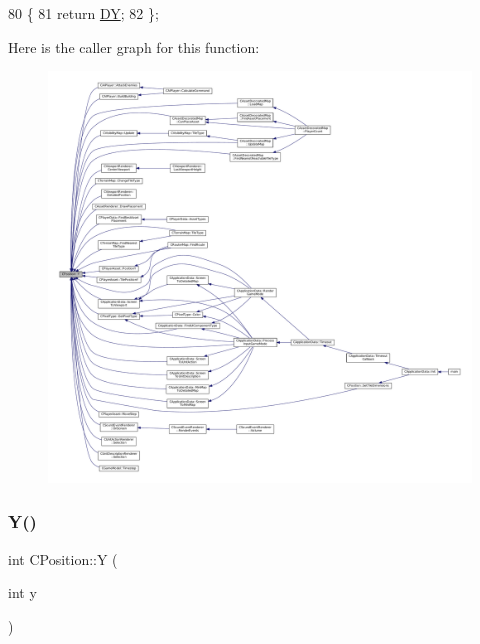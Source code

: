 \begin{DoxyCode}
80                      \{
81             \textcolor{keywordflow}{return} \hyperlink{classCPosition_a84139c9e8eb547e7cf3cb851739943a4}{DY};
82         \};
\end{DoxyCode}
Here is the caller graph for this function\+:
\nopagebreak
\begin{figure}[H]
\begin{center}
\leavevmode
\includegraphics[width=350pt]{classCPosition_a1aa8a30e2f08dda1f797736ba8c13a87_icgraph}
\end{center}
\end{figure}
\hypertarget{classCPosition_a182107c1ded8662afc75f876fa1b990d}{}\label{classCPosition_a182107c1ded8662afc75f876fa1b990d} 
\subsubsection{\texorpdfstring{Y()}{Y()}\hspace{0.1cm}{\footnotesize\ttfamily [2/2]}}
{\footnotesize\ttfamily int C\+Position\+::Y (\begin{DoxyParamCaption}\item[{int}]{y }\end{DoxyParamCaption})\hspace{0.3cm}{\ttfamily [inline]}}



